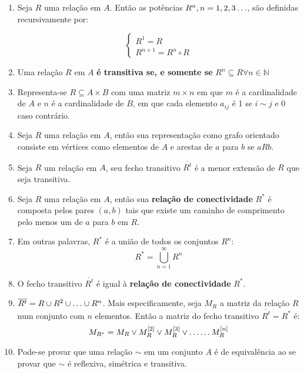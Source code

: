 \documentclass{article}
\begin{document}
\begin{enumerate}
	\item Seja \( R \) uma relação em \( A \). Então as potências \( R^n, n = 1, 2, 3 \mathellipsis \), são definidas recursivamente por:

	      \[\begin{cases}
			      R^1 = R \\
			      R^{n+1} = R^n \circ R
		      \end{cases}\]

	\item Uma relação \( R \) em \( A \) \textbf{é transitiva se, e somente se} \(R^n \subseteq R \forall n \in \mathbb{N} \)

	\item Representa-se \( R \subseteq A \times B \) com uma matriz \( m \times n \) em que \( m \) é a cardinalidade de \( A \) e \( n \) é a cardinalidade de \( B \), em que cada elemento \( a_{ij} \) é 1 se \( i \sim j \) e 0 caso contrário.

	\item Seja \( R \) uma relação em \( A \), então sua representação como grafo orientado consiste em vértices como elementos de \( A \) e arestas de \( a \) para \( b \) se \( aRb \).

	\item Seja \( R \) um relação em \( A \), seu fecho transitivo \( \overline{R^t} \) é a menor extensão de \( R \) que seja transitiva.

	\item Seja \( R \) uma relação em \( A \), então sua \textbf{relação de conectividade} \( R^* \) é composta pelos pares \( (a,b) \) tais que existe um caminho de comprimento pelo menos um de \( a \) para \( b \) em \( R \).

	\item Em outras palavras, \( R^* \) é a união de todos os conjuntos \( R^n \):
	      \[ R^* = \bigcup_{n=1}^{\infty} R^n \]

	\item O fecho transitivo \( \overline{R^t} \) é igual à \textbf{relação de conectividade} \( R^* \).

	\item \( \overline{R^t} = R \cup R^2 \cup \mathellipsis \cup R^n \). Mais especificamente, seja \( M_R \) a matriz da relação \( R \) num conjunto com \( n \) elementos. Então a matriz do fecho transitivo \( \overline{R^t} = R^* \) é:
	      \[ M_{R^*} = M_R \lor M_R^{[2]} \lor M_R^{[3]} \lor \mathellipsis \mathellipsis M_R^{[n]} \]

	\item Pode-se provar que uma relação \( \sim \) em um conjunto \( A \) é de equivalência ao se provar que \( \sim \) é reflexiva, simétrica e transitiva.


\end{enumerate}
\end{document}
